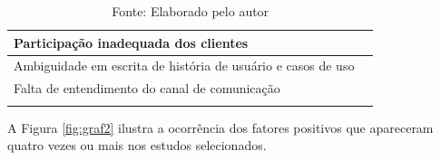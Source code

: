 \begin{longtable}{|p{5cm}|p{10cm}|}
Participação inadequada dos clientes                         &             \cite{Ghanbari201532}
\\ \hline
Ambiguidade em escrita de história de usuário e casos de uso &                                                                                                                                          \cite{mahmood2013software}                                                                                                                                                                                                              \\ \hline
Falta de entendimento do canal de comunicação                &                                                                                                                                                                                                              \cite{mellhorn2017improving}                                                                                                                                        \\ \hline

\caption{Fonte: Elaborado pelo autor}

\label{tab:fatoresN}

\end{longtable}

\newpage

 A Figura \ref{fig:graf2} ilustra a  ocorrência dos fatores positivos que apareceram quatro vezes ou mais nos estudos selecionados.



	\begin{figure}[h!] 
   	    \captionsetup{width=16cm}%
	\end{figure}
   
